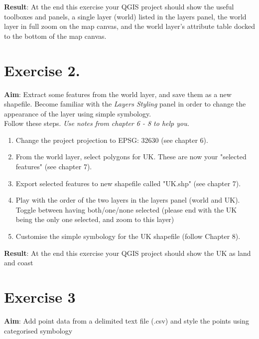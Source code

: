 \documentclass{article}
\begin{document}
\textbf{Result}: At the end this exercise your QGIS project should show the useful toolboxes and panels, a single layer (world) listed in the layers panel, the world layer in full zoom on the map canvas, and the world layer's attribute table docked to the bottom of the map canvas.

\section{Exercise 2.}
\textbf{Aim}: Extract some features from the world layer, and save them as a new shapefile. Become familiar with the \textit{Layers Styling} panel in order to change the appearance of the layer using simple symbology.\\

Follow these steps. \emph{Use notes from chapter 6 - 8 to help you.}
\begin{enumerate}
	\item Change the project projection to EPSG: 32630 (see chapter 6).
	\item From the world layer, select polygons for UK. These are now your "selected features" (see chapter 7).
	\item Export selected features to new shapefile called "UK.shp" (see chapter 7).
	\item Play with the order of the two layers in the layers panel (world and UK). Toggle between having both/one/none selected (please end with the UK being the only one selected, and zoom to this layer)
	\item Customise the simple symbology for the UK shapefile (follow Chapter 8). 
\end{enumerate}

\textbf{Result}: At the end this exercise your QGIS project should show the UK as land and coast

\section{Exercise 3}

\textbf{Aim}: Add point data from a delimited text file (.csv) and style the points using categorised symbology\\
 
\end{document}
